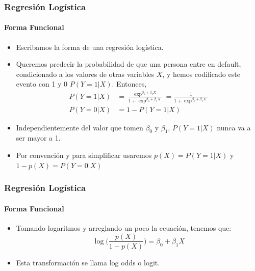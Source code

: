 \documentclass{beamer}
\begin{document}
\begin{frame}
	\frametitle{Regresión Logística}
	\framesubtitle{Forma Funcional}
	\begin{itemize}
		\item Escribamos la forma de una regresión logística.
		\item Queremos predecir la probabilidad de que una persona entre en default, condicionado a los valores de otras variables $X$, y hemos codificado este evento con 1 y 0 $P(Y=1|X)$. Entonces,
		\begin{align}
			P(Y=1|X) & =  \frac{\exp^{\beta_{0} + \beta_{1}X}}{1 + \exp^{\beta_{0} + \beta_{1}X}} = \frac{1}{1+\exp^{\beta_{0} + \beta_{1}X}} \\
			P(Y=0|X) & = 1 - P(Y=1|X)
		\end{align}
		\item Independientemente del valor que tomen $\beta_{0}$ y $\beta_{1}$, $P(Y=1|X)$ nunca  va a ser mayor a 1.
		\item Por convención y para simplificar usaremos $p(X) = P(Y=1|X)$ y $1 - p(X) = P(Y=0|X)$
	\end{itemize}
\end{frame}


\begin{frame}
\frametitle{Regresión Logística}
\framesubtitle{Forma Funcional}
\begin{itemize}
	\item Tomando logaritmos y arreglando un poco la ecuación, tenemos que:
		\begin{equation}
			\log \Bigg(\frac{p(X)}{1-p(X)}\Bigg) = \beta_{0} + \beta_{1}X
	\end{equation}
	\item Esta transformación se llama log odds o logit.
\end{itemize}
\end{frame}


	
\end{document}
